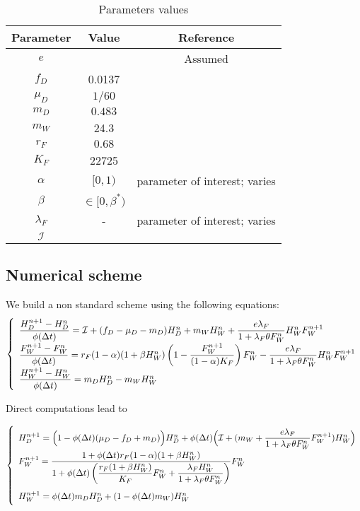 \documentclass{article}
\newcommand{\lfw}{\lambda_{F}}
\newcommand{\lfw}{\lambda_{F}}
\newcommand{\cI}{\mathcal{I}}
\begin{document}
\begin{table}[ht]
\centering
\begin{tabular}{|c|c|c|}
\hline 
Parameter & Value & Reference \\ 
\hline 
$e$ & & Assumed\\
$f_D$ & 0.0137 & \cite{koppert_consommation_1996}\\
$\mu_D$ & $1/60$ & \cite{ins_demographie}\\
$m_D$ & $0.483$ & \cite{avila_interpreting_2019}\\
$m_W$ & 24.3 & \cite{avila_interpreting_2019}\\
$r_F$ & $0.68$ & \cite{robinson_intrinsic_1986}\\
$K_F$ & 22725 & \cite{janson_ecological_1990} \\
$\alpha$ & $[0, 1)$ & parameter of interest; varies \\
$\beta$ & $\in [0, \beta^*)$ &  \\
$\lfw$ & - & parameter of interest; varies \\
$\mathcal{I}$ &  & \\
\hline
\end{tabular}

\caption{Parameters values}
\end{table}

\subsection{Numerical scheme}
We build a non standard scheme using the following equations:	
\begin{equation}
\def\arraystretch{2}
\left\lbrace \begin{array}{l}
\dfrac{H_D^{n+1} - H_D^n}{\phi(\Delta t)} = \cI  + (f_D - \mu_D - m_D) H_D^n + m_W H_W^n + \dfrac{e \lfw}{1 + \lfw \theta F_W^n} H_W^n F_W^{n+1} \\
\dfrac{F_W^{n+1} - F_W^n}{\phi(\Delta t)} = r_F(1-\alpha)(1+\beta H_W^n) \left(1 - \dfrac{F_W^{n+1}}{(1-\alpha)K_F}\right) F_W^n - \dfrac{e \lfw}{1 + \lfw \theta F_W^n} H_W^n F_W^{n+1} \\
\dfrac{H_W^{n+1} - H_W^n}{\phi(\Delta t)} = m_D H_D^n - m_W H_W^{n}
\end{array} \right.
\end{equation}

Direct computations lead to

\begin{equation}
\def\arraystretch{2}
\left\lbrace \begin{array}{l}
H_D^{n+1} = \Big(1 - \phi(\Delta t)(\mu_D - f_D + m_D)\Big)H_D^n + \phi(\Delta t) \Big(\cI  +(m_W  + \dfrac{e \lfw}{1 + \lfw \theta F_W^n} F_W^{n+1})H_W^n \Big) \\
F_W^{n+1} = \dfrac{1 + \phi(\Delta t) r_F(1-\alpha) (1 + \beta H_W^n)}{1 + \phi(\Delta t) \left(\dfrac{r_F(1 + \beta H_W^n)}{K_F}F_W^n + \dfrac{ \lfw H_W^n}{1 + \lfw \theta F_W^n}\right)}F_W^n \\
H_W^{n+1} = \phi(\Delta t) m_D H_D^n +(1 -\phi(\Delta t) m_W) H_W^{n}
\end{array} \right.
\end{equation}
\end{document}
